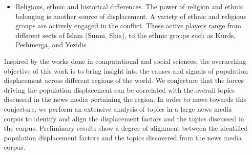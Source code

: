 \begin{appendices}
\begin{itemize}
	\item Religious, ethnic and historical differences. The power of religion and ethnic belonging is another source of displacement. A variety of ethnic and religious groups are actively engaged in the conflict. These active players range from different sects of Islam (Sunni, Shia), to the ethnic groups such as Kurds, Peshmerga, and Yezidis.


\end{itemize}

Inspired by the works done in computational and social sciences, the overarching objective of this work is to bring insight into the causes and signals of population displacement across different regions of the world. We conjecture that the forces driving the population displacement can be correlated with the overall topics discussed in the news media pertaining the region. In order to move towards this conjecture, we perform an extensive analysis of topics in a large news media corpus to identify and align the displacement factors and the topics discussed in the corpus. Preliminary results show a degree of alignment between the identified population displacement factors and the topics discovered from the news media corpus. 



\end{appendices}